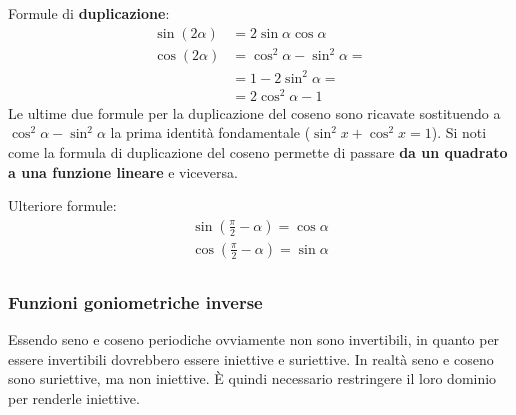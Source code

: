 Formule di \textbf{duplicazione}:\label{sec_formuleDuplicazione}
\begin{align*}
    \sin(2\alpha) &= 2\sin{\alpha}\cos{\alpha}\\
    \cos(2\alpha) &= \cos^2{\alpha} - \sin^2{\alpha} =\\
    &= 1 - 2\sin^2{\alpha} = \\
    &= 2\cos^2{\alpha} - 1
\end{align*}
Le ultime due formule per la duplicazione del coseno sono ricavate sostituendo a $\cos^2{\alpha} - \sin^2{\alpha}$ la prima identità fondamentale ($\sin^2{x} + \cos^2{x} = 1$). Si noti come la formula di duplicazione del coseno permette di passare \textbf{da un quadrato a una funzione lineare} e viceversa.

Ulteriore formule:
\begin{gather*}
    \sin\left(\frac{\pi}{2}-\alpha\right) = \cos{\alpha}\\
    \cos\left(\frac{\pi}{2}-\alpha\right) = \sin{\alpha}\\
\end{gather*}

\subsubsection{Funzioni goniometriche inverse}

Essendo seno e coseno periodiche ovviamente non sono invertibili, in quanto per essere invertibili dovrebbero essere iniettive e suriettive. In realtà seno e coseno sono suriettive, ma non iniettive. È quindi necessario restringere il loro dominio per renderle iniettive.

